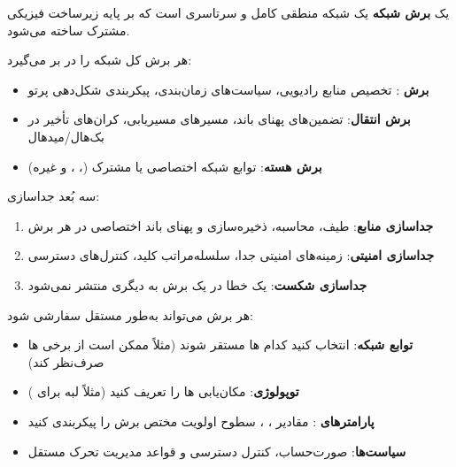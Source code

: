 
یک \textbf{برش شبکه} یک شبکه منطقی کامل و سرتاسری است که بر پایه زیرساخت فیزیکی مشترک ساخته می‌شود.


هر برش کل شبکه را در بر می‌گیرد:

\begin{itemize}
\tightlist
\item
  \textbf{برش }: تخصیص منابع رادیویی، سیاست‌های زمان‌بندی، پیکربندی شکل‌دهی پرتو
\item
  \textbf{برش انتقال}: تضمین‌های پهنای باند، مسیرهای مسیریابی، کران‌های تأخیر در بک‌هال/\allowbreak{}مید‌هال
\item
  \textbf{برش هسته}: توابع شبکه اختصاصی یا مشترک (، ،  و غیره)
\end{itemize}


سه بُعد جداسازی:

\begin{enumerate}
\def\labelenumi{\arabic{enumi}.}
\tightlist
\item
  \textbf{جداسازی منابع}: طیف، محاسبه، ذخیره‌سازی و پهنای باند اختصاصی در هر برش
\item
  \textbf{جداسازی امنیتی}: زمینه‌های امنیتی جدا، سلسله‌مراتب کلید، کنترل‌های دسترسی
\item
  \textbf{جداسازی شکست}: یک خطا در یک برش به دیگری منتشر نمی‌شود
\end{enumerate}


هر برش می‌تواند به‌طور مستقل سفارشی شود:

\begin{itemize}
\tightlist
\item
  \textbf{توابع شبکه}: انتخاب کنید کدام ها مستقر شوند (مثلاً  ممکن است از برخی ها صرف‌نظر کند)
\item
  \textbf{توپولوژی}: مکان‌یابی ها را تعریف کنید (مثلاً  لبه برای )
\item
  \textbf{پارامترهای }: مقادیر ، ، سطوح اولویت مختص برش را پیکربندی کنید
\item
  \textbf{سیاست‌ها}: صورت‌حساب، کنترل دسترسی و قواعد مدیریت تحرک مستقل
\end{itemize}

